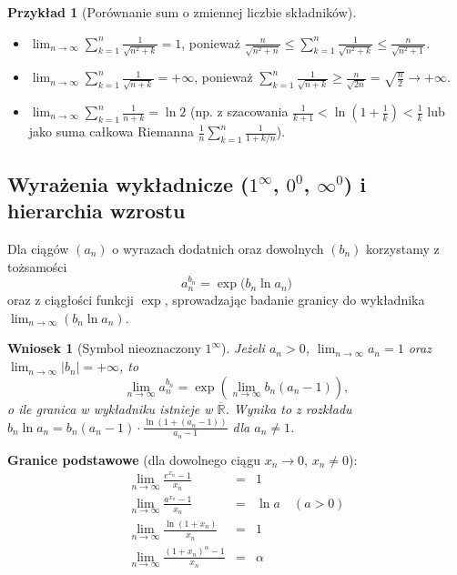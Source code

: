 \documentclass[11pt, a4paper]{article}
\theoremstyle{plain}
\newtheorem*{wniosek}{Wniosek}
\theoremstyle{definition}
\newtheorem*{przyklad}{Przykład}
\begin{document}
\begin{przyklad}[Porównanie sum o zmiennej liczbie składników]
\begin{itemize}
    \item $\lim_{n\to\infty} \sum_{k=1}^n \frac{1}{\sqrt{n^2 + k}} = 1$, ponieważ $\frac{n}{\sqrt{n^2 + n}} \leqslant \sum_{k=1}^n \frac{1}{\sqrt{n^2 + k}} \leqslant \frac{n}{\sqrt{n^2 + 1}}$.
    \item $\lim_{n\to\infty} \sum_{k=1}^n \frac{1}{\sqrt{n + k}} = +\infty$, ponieważ $\sum_{k=1}^n \frac{1}{\sqrt{n + k}} \geqslant \frac{n}{\sqrt{2n}} = \sqrt{\frac{n}{2}} \to +\infty$.
    \item $\lim_{n\to\infty} \sum_{k=1}^n \frac{1}{n + k} = \ln 2$ (np. z szacowania $\frac{1}{k+1} < \ln\left(1 + \frac{1}{k}\right) < \frac{1}{k}$ lub jako suma całkowa Riemanna $\frac{1}{n}\sum_{k=1}^n \frac{1}{1 + k/n}$).
\end{itemize}
\end{przyklad}

\subsection{Wyrażenia wykładnicze ($1^\infty$, $0^0$, $\infty^0$) i hierarchia wzrostu}

Dla ciągów $(a_n)$ o wyrazach dodatnich oraz dowolnych $(b_n)$ korzystamy z tożsamości
\[
a_n^{b_n} = \exp\bigl(b_n \ln a_n\bigr)
\]
oraz z ciągłości funkcji $\exp$, sprowadzając badanie granicy do wykładnika $\lim_{n\to\infty} (b_n \ln a_n)$.

\begin{wniosek}[Symbol nieoznaczony $1^\infty$]
Jeżeli $a_n > 0$, $\lim_{n\to\infty} a_n = 1$ oraz $\lim_{n\to\infty} \lvert b_n \rvert = +\infty$, to
\[
\lim_{n\to\infty} a_n^{b_n} = \exp\left( \lim_{n\to\infty} b_n (a_n - 1) \right),
\]
o ile granica w wykładniku istnieje w $\overline{\mathbb{R}}$. Wynika to z rozkładu $b_n \ln a_n = b_n(a_n - 1) \cdot \frac{\ln(1 + (a_n - 1))}{a_n - 1}$ dla $a_n \neq 1$.
\end{wniosek}

\noindent\textbf{Granice podstawowe} (dla dowolnego ciągu $x_n \to 0$, $x_n \neq 0$):
\[
\begin{array}{rcl}
\displaystyle \lim_{n\to\infty} \frac{e^{x_n}-1}{x_n} &=& 1 \\[0.8em]
\displaystyle \lim_{n\to\infty} \frac{a^{x_n}-1}{x_n} &=& \ln a \quad (a>0) \\[0.8em]
\displaystyle \lim_{n\to\infty} \frac{\ln(1+x_n)}{x_n} &=& 1 \\[0.8em]
\displaystyle \lim_{n\to\infty} \frac{(1+x_n)^\alpha-1}{x_n} &=& \alpha
\end{array}
\]
\end{document}
